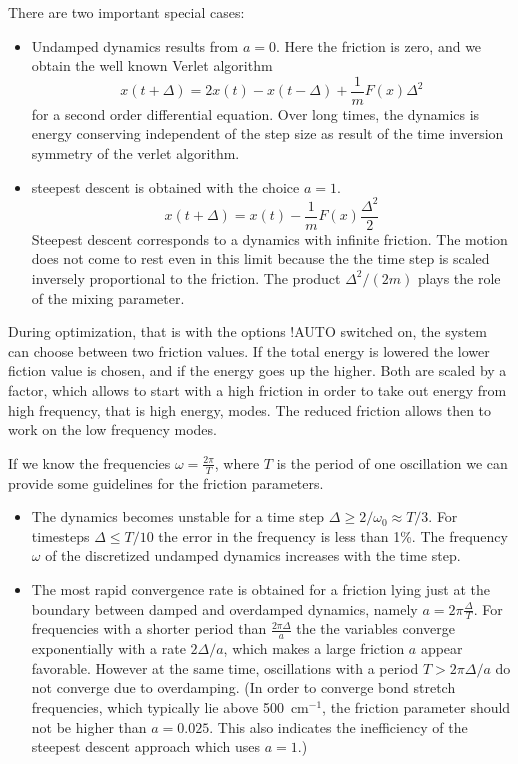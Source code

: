 \documentclass[final,12pt,makeidx,DIV=calc]{article}
\begin{document}
{{{There are two important special cases:
\begin{itemize}
\item Undamped dynamics results from $a=0$. Here the friction is zero,
and we obtain the well known Verlet algorithm
\begin{displaymath}
x(t+\Delta)=2x(t)-x(t-\Delta)+\frac{1}{m}F(x)\Delta^2
\end{displaymath}
  for a second order differential equation. Over long times, the
  dynamics is energy conserving independent of the step size as result
  of the time inversion symmetry of the verlet algorithm.
\item steepest descent is obtained with the choice $a=1$.
   \begin{displaymath}
    x(t+\Delta)=x(t)-\frac{1}{m}F(x)\frac{\Delta^2}{2}
    \end{displaymath}
      Steepest descent corresponds to a dynamics with infinite
      friction.  The motion does not come to rest even in this limit
      because the the time step is scaled inversely proportional to
      the friction. The product $\Delta^2/(2m)$ plays the role of the
      mixing parameter.
\end{itemize}


During optimization, that is with the options !AUTO switched on, the
system can choose between two friction values. If the total energy is
lowered the lower fiction value is chosen, and if the energy goes up
the higher. Both are scaled by a factor, which allows to start with a
high friction in order to take out energy from high frequency, that is
high energy, modes. The reduced friction allows then to work on the
low frequency modes.


If we know the frequencies $\omega=\frac{2\pi}{T}$, where $T$ is the
period of one oscillation we can provide some guidelines for the
friction parameters.
\begin{itemize}
\item The dynamics becomes unstable for a time step $\Delta\ge
    2/\omega_0\approx T/3$. For timesteps $\Delta\le T/10$ the error
    in the frequency is less than 1\%.  The frequency $\omega$ of the
    discretized undamped dynamics increases with the time step.
\item The most rapid convergence rate is obtained for a friction
    lying just at the boundary between damped and overdamped dynamics,
    namely $a=2\pi\frac{\Delta}{T}$. For frequencies with a shorter
    period than $\frac{2\pi\Delta}{a}$ the the variables converge
    exponentially with a rate $2\Delta/a$, which makes a large
    friction $a$ appear favorable.  However at the same time,
    oscillations with a period $T>2\pi\Delta/a$ do not converge due to
    overdamping. (In order to converge bond stretch frequencies, which
    typically lie above 500~cm$^{-1}$, the friction parameter should
    not be higher than $a=0.025$. This also indicates the inefficiency
    of the steepest descent approach which uses $a=1$.)
\end{itemize}

}}}
\end{document}
